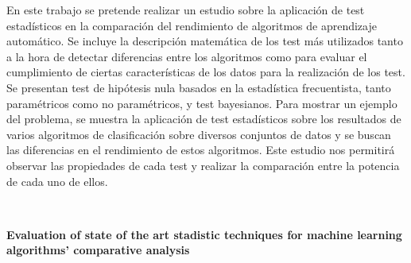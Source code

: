 \chapter*{}





\cleardoublepage
\thispagestyle{empty}

\begin{center}
{\large\bfseries \myTitle }\\
\end{center}
\begin{center}	
	\myName \\
\end{center}


\vspace{0.7cm}
\\

	En este trabajo se pretende realizar un estudio sobre
	la aplicación de test estadísticos en la comparación
	del rendimiento de algoritmos de aprendizaje automático.
	Se incluye la descripción matemática de los test más
	utilizados tanto a la hora de detectar diferencias 
	entre los algoritmos como para evaluar el cumplimiento
	de ciertas características de los datos para la
	realización de los test. Se presentan test de 
	hipótesis nula basados en la estadística frecuentista,
	tanto paramétricos como no paramétricos, y test
	bayesianos. Para mostrar un ejemplo del problema, se 
	muestra la aplicación de test estadísticos sobre
	los resultados de varios algoritmos de clasificación
	sobre diversos conjuntos de datos y se buscan las 
	diferencias en el rendimiento de estos algoritmos.
	Este estudio nos permitirá observar las propiedades
	de cada test y realizar la comparación entre la
	potencia de cada uno de ellos.
	
\\
\cleardoublepage

\thispagestyle{empty}


\begin{center}
{\large\bfseries Evaluation of state of the art stadistic techniques for machine learning algorithms' comparative analysis}\\
\end{center}
\begin{center}
	\myName	\\
\end{center}

